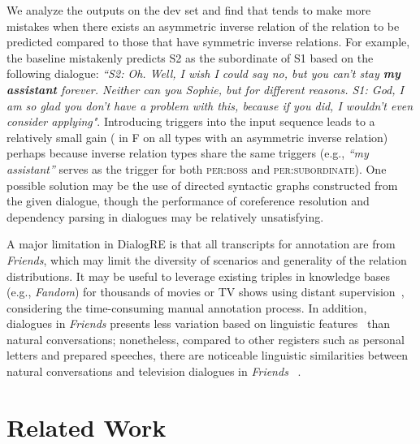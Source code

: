 \documentclass[11pt,a4paper]{article}
\newcommand{\eg}{{e.g.}}
\begin{document}
We analyze the outputs on the dev set and find that  tends to make more mistakes when there exists an asymmetric inverse relation of the relation to be predicted compared to those that have symmetric inverse relations. For example, the baseline mistakenly predicts S2 as the subordinate of S1 based on the following dialogue:
\emph{``S2: Oh. Well, I wish I could say no, but you can't stay \textbf{my assistant} forever. Neither can you Sophie, but for different reasons.
S1: God, I am so glad you don't have a problem with this, because if you did, I wouldn't even consider applying"}. Introducing triggers into the input sequence leads to a relatively small gain ( in F on all types with an asymmetric inverse relation) perhaps because inverse relation types share the same triggers (\eg, \emph{``my assistant''} serves as the trigger for both \textsc{per:boss} and \textsc{per:subordinate}). One possible solution may be the use of directed syntactic graphs constructed from the given dialogue, though the performance of coreference resolution and dependency parsing in dialogues may be relatively unsatisfying.  



A major limitation in DialogRE is that all transcripts for annotation are from \emph{Friends}, which may limit the diversity of scenarios and generality of the relation distributions. 
It may be useful to leverage existing triples in knowledge bases (\eg, \emph{Fandom}) for thousands of movies or TV shows using distant supervision~\cite{Mintz-ds-2009}, considering the time-consuming manual annotation process. In addition, dialogues in \emph{Friends} presents less variation based on linguistic features~\cite{biber1991variation} than natural conversations; nonetheless, compared to other registers such as personal letters and prepared speeches, there are noticeable linguistic similarities between natural conversations and television dialogues in \emph{Friends} ~\cite{quaglio2009television}.























 \section{Related Work}
\end{document}
